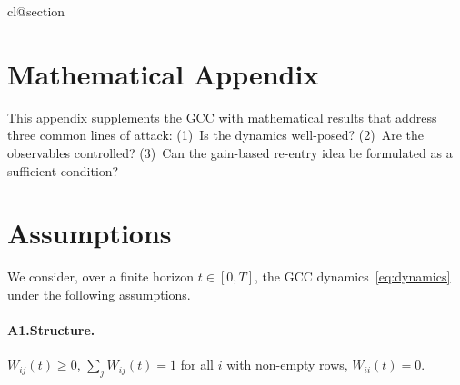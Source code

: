 \documentclass[11pt,a4paper]{article}
\theoremstyle{plain}
\theoremstyle{definition}
\theoremstyle{remark}
\begin{document}
\appendix
\makeatletter
\providecommand*{\@removefromreset}[2]{%
  \let\@tempa\@elt
  \let\@elt\relax
  \expandafter\let\expandafter\@tempb\csname cl@#2\endcsname
  \expandafter\def\csname cl@#2\endcsname{}%
  \def\@elt##1{%
    \ifx ##1#1\else
      \expandafter\@temptokena\expandafter{\csname cl@#2\endcsname}%
      \edef\x{\noexpand\expandafter\noexpand\def\noexpand\csname cl@#2\noexpand\endcsname{\the\@temptokena \noexpand\@elt{##1}}}\x
    \fi}%
  \@tempb
  \let\@elt\@tempa}
\@removefromreset{theorem}{section}
\makeatother
\section*{Mathematical Appendix}
\label{sec:appendix}
\setcounter{section}{0}
\setcounter{theorem}{0}
\renewcommand{\thesection}{A.\arabic{section}}
\renewcommand{\thesubsection}{A.\arabic{section}.\arabic{subsection}}
\renewcommand{\thetheorem}{A.\arabic{theorem}}

\titleformat{\section}{\large\bfseries}{\thesection}{0.6em}{}
\titlespacing*{\section}{0pt}{1.5em}{0.8em}


This appendix supplements the GCC with mathematical results that address three common lines of attack: (1)~Is the dynamics well-posed? (2)~Are the observables controlled? (3)~Can the gain-based re-entry idea be formulated as a sufficient condition?

\section{Assumptions}
\label{app:voraussetzungen}

We consider, over a finite horizon $t \in [0,T]$, the GCC dynamics~\eqref{eq:dynamics} under the following assumptions.

\paragraph{A1.\;Structure.}
$W_{ij}(t) \geq 0$, \;\;$\sum_j W_{ij}(t) = 1$ for all $i$ with non-empty rows, \;\;$W_{ii}(t) = 0$.
\end{document}

